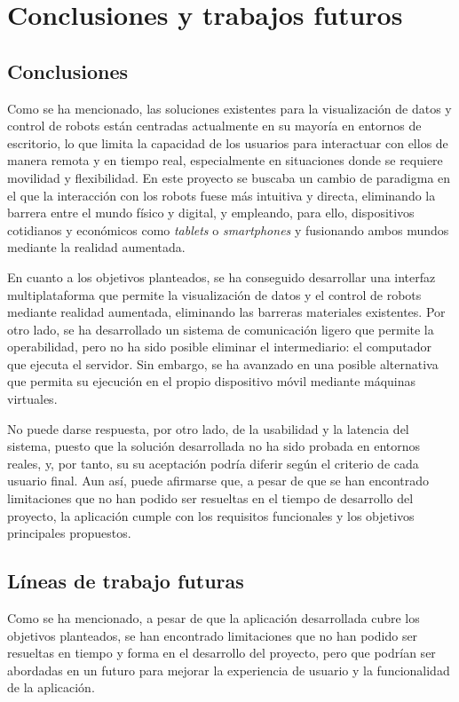 \chapter{Conclusiones y trabajos futuros} \label{chapter:conclusiones}

\section{Conclusiones}
Como se ha mencionado, las soluciones existentes para la visualización de datos y control de robots están centradas actualmente en su mayoría en entornos de escritorio, 
lo que limita la capacidad de los usuarios para interactuar con ellos de manera remota y en tiempo real, especialmente en situaciones donde se 
requiere movilidad y flexibilidad.
En este proyecto se buscaba un cambio de paradigma en el que la interacción con los robots fuese más intuitiva y directa,
eliminando la barrera entre el mundo físico y digital, y empleando, para ello, dispositivos cotidianos y económicos como \textit{tablets} o \textit{smartphones}
y fusionando ambos mundos mediante la realidad aumentada.

En cuanto a los objetivos planteados, se ha conseguido desarrollar una interfaz multiplataforma que permite la 
visualización de datos y el control de robots mediante realidad aumentada, eliminando las barreras materiales existentes.
Por otro lado, se ha desarrollado un sistema de comunicación ligero que permite la operabilidad, pero 
no ha sido posible eliminar el intermediario: el computador que ejecuta el servidor. Sin embargo, se ha avanzado 
en una posible alternativa que permita su ejecución en el propio dispositivo móvil mediante máquinas virtuales.

No puede darse respuesta, por otro lado, de la usabilidad y la latencia del sistema, puesto que la solución desarrollada 
no ha sido probada en entornos reales, y, por tanto, su su aceptación podría diferir según el criterio de cada usuario final.
Aun así, puede afirmarse que, 
a pesar de que se han encontrado limitaciones que no han podido ser resueltas en el tiempo de desarrollo del proyecto, 
la aplicación cumple con los requisitos funcionales y los objetivos principales propuestos.

\section{Líneas de trabajo futuras}
Como se ha mencionado, a pesar de que la aplicación desarrollada cubre los objetivos planteados, se han encontrado limitaciones que no han podido ser 
resueltas en tiempo y forma en el desarrollo del proyecto, pero que podrían ser abordadas en un futuro para mejorar la experiencia 
de usuario y la funcionalidad de la aplicación. 

